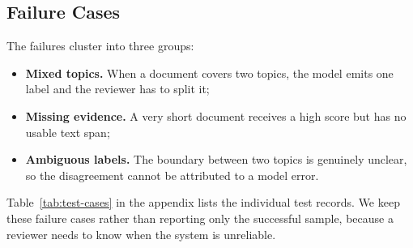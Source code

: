 \subsection{Failure Cases}
\label{sec:failures}

The failures cluster into three groups:
\begin{itemize}
  \item \textbf{Mixed topics.} When a document covers two topics, the model emits one label
        and the reviewer has to split it;
  \item \textbf{Missing evidence.} A very short document receives a high score but has no
        usable text span;
  \item \textbf{Ambiguous labels.} The boundary between two topics is genuinely unclear, so
        the disagreement cannot be attributed to a model error.
\end{itemize}

Table~\ref{tab:test-cases} in the appendix lists the individual test records. We keep these
failure cases rather than reporting only the successful sample, because a reviewer needs to
know when the system is unreliable.
